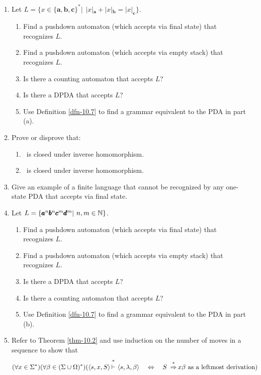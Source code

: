 \begin{enumerate}[{10.}1.]
\item Let $L=\{x\in\{\pmb{a},\pmb{b},\pmb{c}\}^*|\ \ |x|_{\pmb{a}}+|x|_{\pmb{b}}=
|x|_{\pmb{c}}\}$.
\begin{enumerate}
\item Find a pushdown automaton (which accepts via final state) that recognizes
$L$.
\item Find a pushdown automaton (which accepts via empty stack) that recognizes
$L$.
\item Is there a counting automaton that accepts $L$?
\item Is there a DPDA that accepts $L$?
\item Use Definition \ref{dfn-10.7} to find a grammar equivalent to the PDA in part (a).
\end{enumerate}

\item Prove or disprove that:
\begin{enumerate}
\item \PSIG\ is closed under inverse homomorphism.
\item \ASIG\ is closed under inverse homomorphism.
\end{enumerate}

\item Give an example of a finite language that cannot be recognized by any
one-state PDA that accepts via final state.

\item Let $L=\{\pmb{a}^n\pmb{b}^n\pmb{c}^m\pmb{d}^m|\ n,m\in\NN\}$.
\begin{enumerate}
\item Find a pushdown automaton (which accepts via final state) that recognizes
$L$.
\item Find a pushdown automaton (which accepts via empty stack) that recognizes
$L$.
\item Is there a DPDA that accepts $L$?
\item Is there a counting automaton that accepts $L$?
\item Use Definition \ref{dfn-10.7} to find a grammar equivalent to the PDA in part (b).
\end{enumerate}

\item Refer to Theorem \ref{thm-10.2} and use induction on the number of moves in a
sequence to show that
\[ (\forall x\in\Sigma^*)(\forall\beta\in(\Sigma\cup\Omega)^*)(\langle s,x,S\rangle
	\Dvdash\langle s,\lambda,\beta\rangle \ \ \  \Leftrightarrow\ \ \  S\ 
	\DRightarrow x\beta\text{ as a leftmost derivation}) \]


\end{enumerate}
